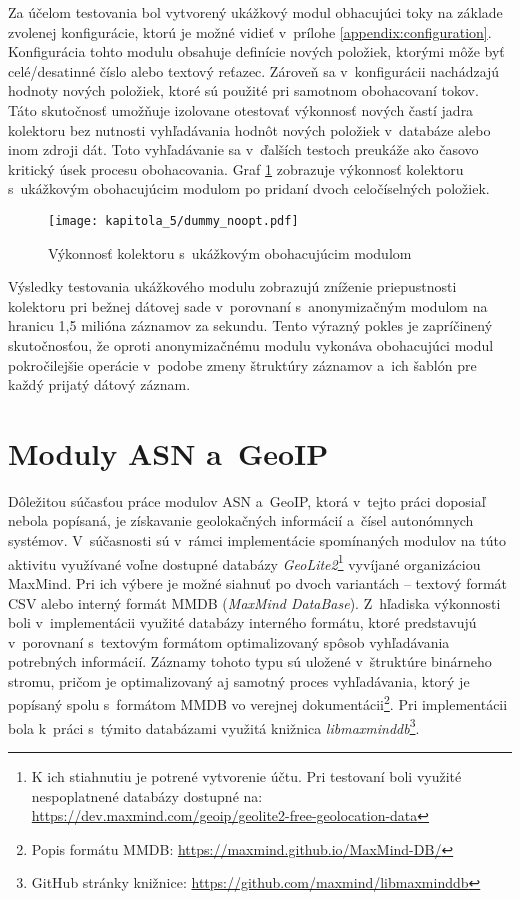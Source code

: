Za účelom testovania bol vytvorený ukážkový modul obhacujúci toky na základe zvolenej konfigurácie, ktorú je možné vidieť v~prílohe \ref{appendix:configuration}.
Konfigurácia tohto modulu obsahuje definície nových položiek, ktorými môže byť celé/desatinné číslo alebo textový reťazec. Zároveň sa v~konfigurácii nachádzajú hodnoty nových položiek, ktoré sú použité pri samotnom obohacovaní tokov.
Táto skutočnosť umožňuje izolovane otestovať výkonnosť nových častí jadra kolektoru bez nutnosti vyhľadávania hodnôt nových položiek v~databáze alebo inom zdroji dát. Toto vyhľadávanie sa v~ďalších testoch preukáže ako časovo kritický úsek procesu
obohacovania. Graf \ref{fig:tests_dummy_noopt} zobrazuje výkonnosť kolektoru s~ukážkovým obohacujúcim modulom po pridaní dvoch celočíselných položiek.

\begin{figure}[ht]
    \centering
    \texttt{[image: kapitola\_5/dummy\_noopt.pdf]}
    \caption{Výkonnosť kolektoru s~ukážkovým obohacujúcim modulom}
    \label{fig:tests_dummy_noopt}
\end{figure}

Výsledky testovania ukážkového modulu zobrazujú zníženie priepustnosti kolektoru pri bežnej dátovej sade v~porovnaní s~anonymizačným modulom na hranicu 1,5 milióna záznamov za sekundu. Tento výrazný pokles je zapríčinený skutočnosťou, že oproti anonymizačnému modulu vykonáva
obohacujúci modul pokročilejšie operácie v~podobe zmeny štruktúry záznamov a~ich šablón pre každý prijatý dátový záznam.

\section{Moduly ASN a~GeoIP}

Dôležitou súčasťou práce modulov ASN a~GeoIP, ktorá v~tejto práci doposiaľ nebola popísaná, je získavanie geolokačných informácií a~čísel autonómnych systémov. V~súčasnosti sú v~rámci implementácie spomínaných modulov na túto aktivitu využívané voľne dostupné databázy
\textit{GeoLite2}\footnote{K ich stiahnutiu je potrené vytvorenie účtu. Pri testovaní boli využité nespoplatnené databázy dostupné na: \url{https://dev.maxmind.com/geoip/geolite2-free-geolocation-data}} vyvíjané organizáciou MaxMind. Pri ich výbere je možné siahnuť po dvoch variantách --
textový formát CSV alebo interný formát MMDB (\textit{Max\-Mind Da\-ta\-Base}). Z~hľadiska výkonnosti boli v~implementácii využité databázy interného formátu, ktoré predstavujú v~porovnaní s~textovým formátom optimalizovaný spôsob vyhľadávania potrebných informácií.
Záznamy tohoto typu sú uložené v~štruktúre binárneho stromu, pričom je optimalizovaný aj samotný proces vyhľadávania, ktorý je popísaný spolu s~formátom MMDB vo verejnej dokumentácii\footnote{Popis formátu MMDB: \url{https://maxmind.github.io/MaxMind-DB/}}. Pri implementácii bola
k~práci s~týmito databázami využitá knižnica \textit{libmaxminddb}\footnote{GitHub stránky knižnice: \url{https://github.com/maxmind/libmaxminddb}}.

